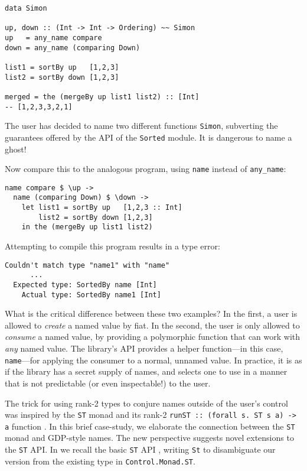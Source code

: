 \documentclass[format=sigplan, review=false, screen=true, 10pt]{acmart}
\makeatletter
\let\origsection\section
\renewcommand\section{\@ifstar{\starsection}{\nostarsection}}
\newcommand\nostarsection[1]
{\sectionprelude\origsection{#1}\sectionpostlude}
\newcommand\starsection[1]
{\sectionprelude\origsection*{#1}\sectionpostlude}
\newcommand\sectionprelude{%
  \vspace{-0.5em}
}
\newcommand\sectionpostlude{%
  \vspace{0em}
}
\makeatother
\begin{document}
\begin{verbatim}
data Simon
  
up, down :: (Int -> Int -> Ordering) ~~ Simon
up   = any_name compare
down = any_name (comparing Down)

list1 = sortBy up   [1,2,3]
list2 = sortBy down [1,2,3]

merged = the (mergeBy up list1 list2) :: [Int]
-- [1,2,3,3,2,1]
\end{verbatim}
\noindent
The user has decided to name two different functions \texttt{Simon}, subverting the
guarantees offered by the API of the \texttt{Sorted} module. It is dangerous to
name a ghost!

Now compare this to the analogous program, using \texttt{name} instead of \texttt{any\_name}:
\begin{verbatim}
name compare $ \up ->
  name (comparing Down) $ \down ->
    let list1 = sortBy up   [1,2,3 :: Int]
        list2 = sortBy down [1,2,3]
    in the (mergeBy up list1 list2)
\end{verbatim}
\noindent
Attempting to compile this program results in a type error:

\begin{lstlisting}
Couldn't match type "name1" with "name"
      ...
  Expected type: SortedBy name [Int]
    Actual type: SortedBy name1 [Int]
\end{lstlisting}
\noindent
What is the critical difference between these two examples? In the first, a user is
allowed to \emph{create} a named value by fiat. In the second, the user is only allowed to \emph{consume} a named value, by
providing a polymorphic function that can work with \emph{any} named value. The library's API provides
a helper function---in this case, \texttt{name}---for applying the consumer to a normal, unnamed value.
In practice, it is as if the
library has a secret supply of names, and selects one to use in a manner that is not
predictable (or even inspectable!) to the user.


\section{Case Study \#2: Sharing State Threads}
The trick for using rank-2 types to conjure names outside of the user's control was
inspired by the \texttt{ST} monad and its rank-2 \texttt{runST :: (forall s. ST s a) -> a}
function \cite{launchbury1994lazy}. In this brief case-study, we elaborate the connection
between the \texttt{ST} monad and GDP-style names. The new perspective suggests novel
extensions to the \texttt{ST} API.
In  we recall the basic \texttt{ST} API \cite{launchbury1994lazy}, writing \texttt{St} to
disambiguate our version from the existing type in \texttt{Control.Monad.ST}.
\end{document}
